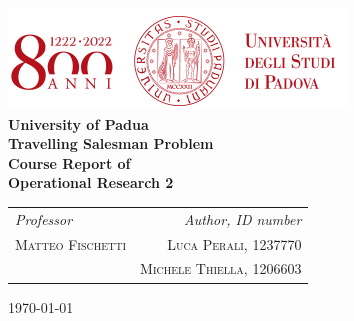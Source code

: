 
\begin{titlepage}
  \clearpage\thispagestyle{empty}
  \centering
  \vspace{2cm}

  \includegraphics[scale=0.75]{uniLogo.png} \\ [1cm]
  \LARGE\textbf{University of Padua} \\ [4cm]
  \Huge\textbf{Travelling Salesman Problem} \\ [1cm]
  \Large\textbf{Course Report of \\ Operational Research 2} \\ [4cm]
  \begin{table}[h]
    \begin{tabularx}{\textwidth}{X r}

        \Large\textit{Professor}  & \Large\textit{Author, ID number} \\ [0.2cm]
        \Large\textsc{Matteo Fischetti}  & \Large\textsc{Luca Perali, 1237770} \\ [0.2cm]
          & \Large\textsc{Michele Thiella, 1206603} \\ [0.3cm]
        \hline
    \end{tabularx}
  \end{table}

  \textsc\Large \today \\ [2cm]

  \pagebreak
\end{titlepage}

